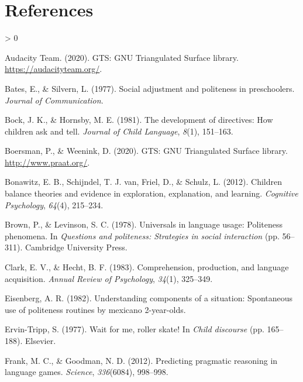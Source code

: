 \documentclass[
  english,
  man,floatsintext]{apa6}
\newlength{\cslhangindent}
\newenvironment{CSLReferences}[2] %
 {%
  \setlength{\parindent}{0pt}
  \ifodd #1 \everypar{\setlength{\hangindent}{\cslhangindent}}\ignorespaces\fi
  \ifnum #2 > 0
  \setlength{\parskip}{#2\baselineskip}
  \fi
 }%
 {}
\begin{document}
\newpage

\hypertarget{references}{%
\section{References}\label{references}}

\begingroup
\setlength{\parindent}{-0.5in}
\setlength{\leftskip}{0.5in}

\hypertarget{refs}{}
\begin{CSLReferences}{1}{0}
\leavevmode\hypertarget{ref-audacity2020}{}%
Audacity Team. (2020). {GTS}: {GNU} {Triangulated} {Surface} library. \url{https://audacityteam.org/}.

\leavevmode\hypertarget{ref-bates1977}{}%
Bates, E., \& Silvern, L. (1977). Social adjustment and politeness in preschoolers. \emph{Journal of Communication}.

\leavevmode\hypertarget{ref-bock1981}{}%
Bock, J. K., \& Hornsby, M. E. (1981). The development of directives: How children ask and tell. \emph{Journal of Child Language}, \emph{8}(1), 151--163.

\leavevmode\hypertarget{ref-boersman2020}{}%
Boersman, P., \& Weenink, D. (2020). {GTS}: {GNU} {Triangulated} {Surface} library. \url{http://www.praat.org/}.

\leavevmode\hypertarget{ref-bonawitz2012}{}%
Bonawitz, E. B., Schijndel, T. J. van, Friel, D., \& Schulz, L. (2012). Children balance theories and evidence in exploration, explanation, and learning. \emph{Cognitive Psychology}, \emph{64}(4), 215--234.

\leavevmode\hypertarget{ref-brown1978}{}%
Brown, P., \& Levinson, S. C. (1978). Universals in language usage: Politeness phenomena. In \emph{Questions and politeness: Strategies in social interaction} (pp. 56--311). Cambridge University Press.

\leavevmode\hypertarget{ref-clark1983}{}%
Clark, E. V., \& Hecht, B. F. (1983). Comprehension, production, and language acquisition. \emph{Annual Review of Psychology}, \emph{34}(1), 325--349.

\leavevmode\hypertarget{ref-eisenberg1982}{}%
Eisenberg, A. R. (1982). Understanding components of a situation: Spontaneous use of politeness routines by mexicano 2-year-olds.

\leavevmode\hypertarget{ref-ervintripp1977}{}%
Ervin-Tripp, S. (1977). Wait for me, roller skate! In \emph{Child discourse} (pp. 165--188). Elsevier.

\leavevmode\hypertarget{ref-frank2012}{}%
Frank, M. C., \& Goodman, N. D. (2012). Predicting pragmatic reasoning in language games. \emph{Science}, \emph{336}(6084), 998--998.


\end{CSLReferences}
\end{document}
